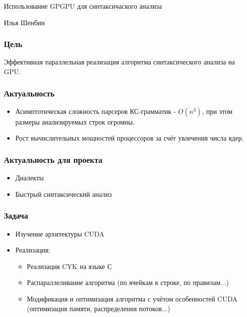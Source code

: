 \documentclass{beamer}
\begin{document}
\begin{frame}
	\transwipe[direction=90]
	\begin{block}{}
	    \begin{center}
	        \huge{Использование GPGPU для синтаксичаского анализа}
	    \end{center}
	\end{block}
	\begin{center}
	    \huge{Илья Шенбин}
	\end{center}
\end{frame}

\begin{frame}
	\transwipe[direction=90]
	\frametitle{Цель}
	Эффективная параллельная реализация алгоритма синтаксического анализа на GPU.
\end{frame}

\begin{frame}
	\transwipe[direction=90]
	\frametitle{Актуальность}
	\begin{itemize}
        \item Асимптотическая сложность парсеров КС-грамматик - $O(n^3)$, при этом размеры анализируемых строк огромны.
        \item Рост вычислительных мощностей процессоров за счёт увлечения числа ядер.
    \end{itemize}
\end{frame}    

\begin{frame}
	\transwipe[direction=90]
	\frametitle{Актуальность для проекта}
	\begin{itemize}
        \item Диалекты
        \item Быстрый синтаксический анализ
    \end{itemize}
\end{frame}

\begin{frame}
	\transwipe[direction=90]
	\frametitle{Задача}
	\begin{itemize}
        \item Изучение архитектуры CUDA
        \item Реализация:
    	\begin{itemize}
            \item Реализация CYK на языке С
            \item Распараллеливание алгоритма (по ячейкам в строке, по правилам...)
            \item Модификация и оптимизация алгоритма с учётом особенностей CUDA (оптимизация памяти, распределения потоков...)
        \end{itemize}

    \end{itemize}
\end{frame}    
\end{document}
